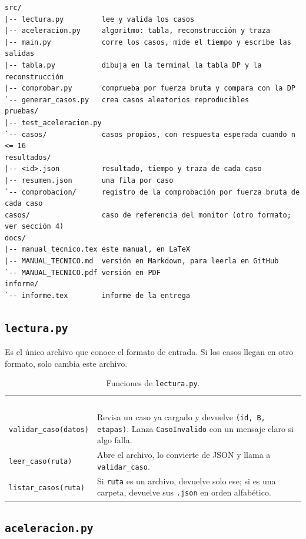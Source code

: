 \documentclass[11pt,a4paper]{article}
\newcommand{\cod}[1]{\texttt{#1}}
\newcommand{\encabezado}{\rowcolor{fondo}}
\newcommand{\blanco}[1]{\textcolor{white}{\textbf{#1}}}
\begin{document}
\begin{lstlisting}
src/
|-- lectura.py         lee y valida los casos
|-- aceleracion.py     algoritmo: tabla, reconstrucción y traza
|-- main.py            corre los casos, mide el tiempo y escribe las salidas
|-- tabla.py           dibuja en la terminal la tabla DP y la reconstrucción
|-- comprobar.py       comprueba por fuerza bruta y compara con la DP
`-- generar_casos.py   crea casos aleatorios reproducibles
pruebas/
|-- test_aceleracion.py
`-- casos/             casos propios, con respuesta esperada cuando n <= 16
resultados/
|-- <id>.json          resultado, tiempo y traza de cada caso
|-- resumen.json       una fila por caso
`-- comprobacion/      registro de la comprobación por fuerza bruta de cada caso
casos/                 caso de referencia del monitor (otro formato; ver sección 4)
docs/
|-- manual_tecnico.tex este manual, en LaTeX
|-- MANUAL_TECNICO.md  versión en Markdown, para leerla en GitHub
`-- MANUAL_TECNICO.pdf versión en PDF
informe/
`-- informe.tex        informe de la entrega
\end{lstlisting}

\subsection{\cod{lectura.py}}

Es el único archivo que conoce el formato de entrada. Si los casos llegan en otro formato, solo cambia este archivo.

\begin{table}[H]
\centering\small
\renewcommand{\arraystretch}{1.2}
\begin{tabularx}{\textwidth}{@{}lX@{}}
\encabezado \blanco{Función} & \blanco{Qué hace} \\
\cod{validar\_caso(datos)} & Revisa un caso ya cargado y devuelve \cod{(id, B, etapas)}. Lanza \cod{CasoInvalido} con un mensaje claro si algo falla. \\
\cod{leer\_caso(ruta)} & Abre el archivo, lo convierte de JSON y llama a \cod{validar\_caso}. \\
\cod{listar\_casos(ruta)} & Si \cod{ruta} es un archivo, devuelve solo ese; si es una carpeta, devuelve sus \cod{.json} en orden alfabético. \\
\bottomrule
\end{tabularx}
\caption{Funciones de \cod{lectura.py}.}
\end{table}

\subsection{\cod{aceleracion.py}}
\end{document}
